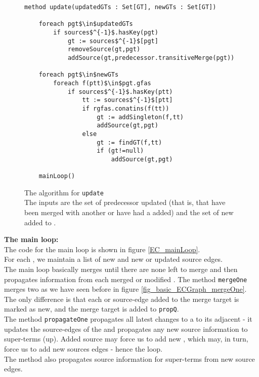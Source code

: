 \begin{figure}
\begin{lstlisting}
method update(updatedGTs : Set[GT], newGTs : Set[GT])
	
	foreach pgt$\in$updatedGTs 
		if sources$^{-1}$.hasKey(pgt)
			gt := sources$^{-1}$[pgt]
			removeSource(gt,pgt)
			addSource(gt,predecessor.transitiveMerge(pgt))
	
	foreach pgt$\in$newGTs
		foreach f(ptt)$\in$pgt.gfas
			if sources$^{-1}$.hasKey(ptt)
				tt := sources$^{-1}$[ptt]
				if rgfas.conatins(f(tt))
					gt := addSingleton(f,tt)
					addSource(gt,pgt)
				else
					gt := findGT(f,tt)
					if (gt!=null)
						addSource(gt,pgt)
				
	mainLoop()
\end{lstlisting}
\caption{The algorithm for \lstinline|update|\\
The inputs are the set of predecessor \GTs{} updated (that is, that have been merged with another \GT{} or have had a \GFA{} added)
and the set of new \GTs{} added to .
}
\label{EC_update}
\end{figure}



\bigskip
\noindent
\textbf{The main loop:}\\
The code for the main loop is shown in figure \ref{EC_mainLoop}.\\
For each \GT{}, we maintain a list of new \GFAs{} and new or updated source edges.\\
The main loop basically merges \GTs{} until there are none left to merge and then propagates information from each merged or modified \GT{}.
The method \lstinline|mergeOne| merges two \GTs{} as we have seen before in figure \ref{fig_basic_ECGraph_mergeOne}.
The only difference is that each \GFA{} or source-edge added to the merge target is marked as new, and the merge target is added to \lstinline|propQ|.\\
The method \lstinline|propagateOne| propagates all latest changes to a \GT{} to its adjacent \GTs{} - it updates the source-edges 
of the \GT{} and propagates any new source information to super-terms (up). Added source may force us to add new \GFAs{}, which may, in turn, force us to add new sources edges - hence the loop.\\ 
The method also propagates source information for super-terms from new source edges.


